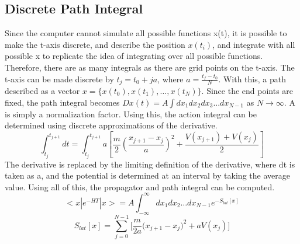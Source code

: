 \documentclass{article}
\begin{document}
\subsection{Discrete Path Integral}
Since the computer cannot simulate all possible functions x(t), it is possible to make the t-axis discrete, and describe the position $x(t_i)$, and integrate with all possible x to replicate the idea of integrating over all possible functions. Therefore, there are as many integrals as there are grid points on the t-axis. 
The t-axis can be made discrete by $t_j=t_0 + ja$, where $a = \frac{t_f-t_0}{N}$. With this, a path described as a vector $x = \{x(t_0),x(t_1), \dots ,x(t_N)\}$. Since the end points are fixed, the path integral becomes $Dx(t)=A\int dx_1dx_2dx_3...dx_{N-1}$ as $N \xrightarrow{} \infty$. A is simply a normalization factor. Using this, the action integral can be determined using discrete approximations of the derivative.
\begin{equation}
    \int_{t_j}^{t_{j+1}}dt =\int_{t_j}^{t_{j+1}}a[\frac{m}{2}(\frac{x_{j+1} - x_{j}}{a})^2+\frac{V(x_{j+1})+V(x_j)}{2}]
\end{equation}
The derivative is replaced by the limiting definition of the derivative, where dt is taken as a, and the potential is determined at an interval by taking the average value. Using all of this, the propagator and path integral can be computed.
\begin{equation}
    <x|e^{-HT}|x>=A\int_{-\infty}^{\infty}dx_1dx_2\dots dx_{N-1}e^{-S_{lat}[x]}
\end{equation}
\begin{equation}
    S_{lat}[x]=\sum_{j=0}^{N-1}[\frac{m}{2a}({x_{j+1}-x_{j})^2 + aV(x_j)]}
\end{equation}
\end{document}
